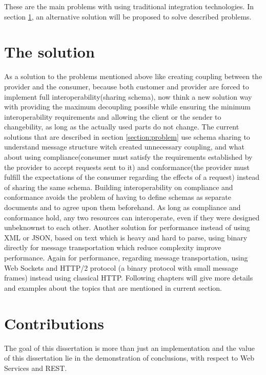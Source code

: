 These are the main problems with using traditional integration technologies. In section \ref{section:solution}, an alternative solution will be proposed to solve described problems.

\section{The solution}
\label{section:solution}

As a solution to the problems mentioned above like creating coupling between the provider and the consumer, because both customer and provider are forced to implement full interoperability(sharing schema), now think a new solution way with providing the maximum decoupling possible while ensuring the minimum interoperability requirements and allowing the client or the sender to changebility, as long as the actually used parts do not change. The current solutions that are described in section \ref{section:problem} use schema sharing to understand message structure witch created unnecessary coupling, and what about using compliance(consumer must satisfy the requirements established by the provider to accept requests sent to it)\citep{compliance:def} and conformance(the provider must fulfill the expectations of the consumer regarding the effects of a request)\citep{comformance:def2} instead of sharing the same schema. Building interoperability on compliance and conformance avoids the problem of having to define schemas as separate documents and to agree upon them beforehand. As long as compliance and conformance hold, any two resources can interoperate, even if they were designed unbeknownst to each other. Another solution for performance instead of using XML or JSON, based on text which is heavy and hard to parse, using binary directly for message transportation which reduce complexity improve performance. Again for performance, regarding message transportation, using Web Sockets and HTTP/2 protocol (a binary protocol with small message frames) instead using classical HTTP. Following chapters will give more details and examples about the topics that are mentioned in current section.

\section{Contributions}
\label{section:contributions}
The goal of this dissertation is more than just an implementation and the value of this dissertation lie in the demonstration of conclusions, with respect to Web Services and REST.

